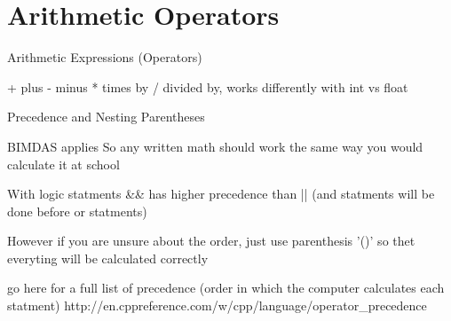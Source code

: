 \documentclass[../lecture2-variablesandcontrolstructures.tex]{subfiles}
\begin{document}
\section{Arithmetic Operators}


\begin{frame}[fragile]{Arithmetic Expressions (Operators)}

+ plus
- minus
* times by
/ divided by, works differently with int vs float

\end{frame}


\begin{frame}[fragile]{Precedence and Nesting Parentheses}

BIMDAS applies
So any written math should work the same way you would calculate it at school

With logic statments && has higher precedence than || (and statments will be done before or statments)

However if you are unsure about the order, just use parenthesis '()' so thet everyting will be calculated correctly

go here for a full list of precedence (order in which the computer calculates each statment)
http://en.cppreference.com/w/cpp/language/operator_precedence

\end{frame}

\end{document}
